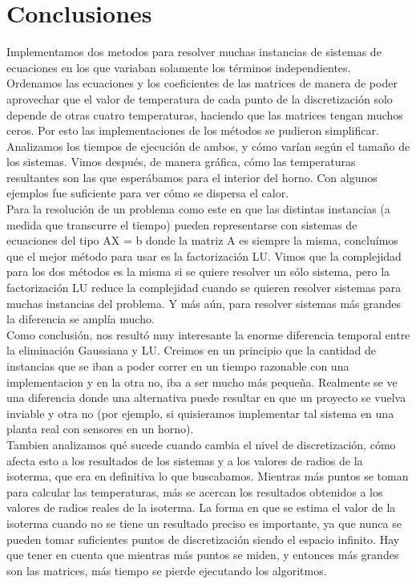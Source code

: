 \section{Conclusiones}
Implementamos dos metodos para resolver muchas instancias de sistemas de ecuaciones en los que variaban solamente los términos independientes. \\
Ordenamos las ecuaciones y los coeficientes de las matrices de manera de poder aprovechar que el valor de temperatura de cada punto de la discretización solo depende de otras cuatro temperaturas, haciendo que las matrices tengan muchos ceros. Por esto las implementaciones de los métodos se pudieron simplificar.\\

Analizamos los tiempos de ejecución de ambos, y cómo varían según el tamaño de los sistemas. Vimos después, de manera gráfica, cómo las temperaturas resultantes son las que esperábamos para el interior del horno. Con algunos ejemplos fue suficiente para ver cómo se dispersa el calor.\\

Para la resolución de un problema como este en que las distintas instancias (a medida que transcurre el tiempo) pueden representarse con sistemas de ecuaciones del tipo AX = b donde la matriz A es siempre la misma, concluímos que el mejor método para usar es la factorización LU. Vimos que la complejidad para los dos métodos es la misma si se quiere resolver un sólo sistema, pero la factorización LU reduce la complejidad cuando se quieren resolver sistemas para muchas instancias del problema. Y más aún, para resolver sistemas más grandes la diferencia se amplía mucho.\\

Como conclusión, nos resultó muy interesante la enorme diferencia temporal entre la eliminación Gaussiana y LU. Creimos en un principio que la cantidad de instancias que se iban a poder correr en un tiempo razonable con una implementacion y en la otra no, iba a ser mucho más pequeña. Realmente se ve una diferencia donde una alternativa puede resultar en que un proyecto se vuelva inviable y otra no (por ejemplo, si quisieramos implementar tal sistema en una planta real con sensores en un horno).\\

Tambien analizamos qué sucede cuando cambia el nivel de discretización, cómo afecta esto a los resultados de los sistemas y a los valores de radios de la isoterma, que era en definitiva lo que buscabamos. Mientras más puntos se toman para calcular las temperaturas, más se acercan los resultados obtenidos a los valores de radios reales de la isoterma. La forma en que se estima el valor de la isoterma cuando no se tiene un resultado preciso es importante, ya que nunca se pueden tomar suficientes puntos de discretización siendo el espacio infinito. Hay que tener en cuenta que mientras más puntos se miden, y entonces más grandes son las matrices, más tiempo se pierde ejecutando los algoritmos.\\

